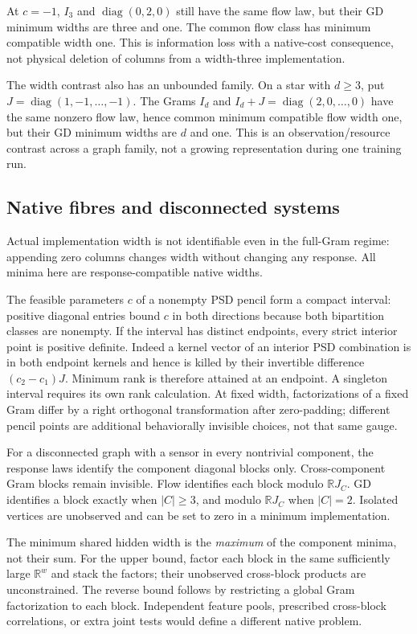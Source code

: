 \documentclass[11pt]{article}
\theoremstyle{remark}
\newcommand{\RR}{\mathbb R}
\newcommand{\diag}{\operatorname{diag}}
\begin{document}
At $c=-1$, $I_3$ and $\diag(0,2,0)$ still have the same flow law, but their GD minimum widths are three and one. The common flow class has minimum compatible width one. This is information loss with a native-cost consequence, not physical deletion of columns from a width-three implementation.

The width contrast also has an unbounded family. On a star with $d\geq3$, put $J=\diag(1,-1,\ldots,-1)$. The Grams $I_d$ and $I_d+J=\diag(2,0,\ldots,0)$ have the same nonzero flow law, hence common minimum compatible flow width one, but their GD minimum widths are $d$ and one. This is an observation/resource contrast across a graph family, not a growing representation during one training run.

\subsection{Native fibres and disconnected systems}

Actual implementation width is not identifiable even in the full-Gram regime: appending zero columns changes width without changing any response. All minima here are response-compatible native widths.

The feasible parameters $c$ of a nonempty PSD pencil form a compact interval: positive diagonal entries bound $c$ in both directions because both bipartition classes are nonempty. If the interval has distinct endpoints, every strict interior point is positive definite. Indeed a kernel vector of an interior PSD combination is in both endpoint kernels and hence is killed by their invertible difference $(c_2-c_1)J$. Minimum rank is therefore attained at an endpoint. A singleton interval requires its own rank calculation. At fixed width, factorizations of a fixed Gram differ by a right orthogonal transformation after zero-padding; different pencil points are additional behaviorally invisible choices, not that same gauge.

For a disconnected graph with a sensor in every nontrivial component, the response laws identify the component diagonal blocks only. Cross-component Gram blocks remain invisible. Flow identifies each block modulo $\RR J_C$. GD identifies a block exactly when $|C|\geq3$, and modulo $\RR J_C$ when $|C|=2$. Isolated vertices are unobserved and can be set to zero in a minimum implementation.

The minimum shared hidden width is the \emph{maximum} of the component minima, not their sum. For the upper bound, factor each block in the same sufficiently large $\RR^w$ and stack the factors; their unobserved cross-block products are unconstrained. The reverse bound follows by restricting a global Gram factorization to each block. Independent feature pools, prescribed cross-block correlations, or extra joint tests would define a different native problem.
\end{document}
